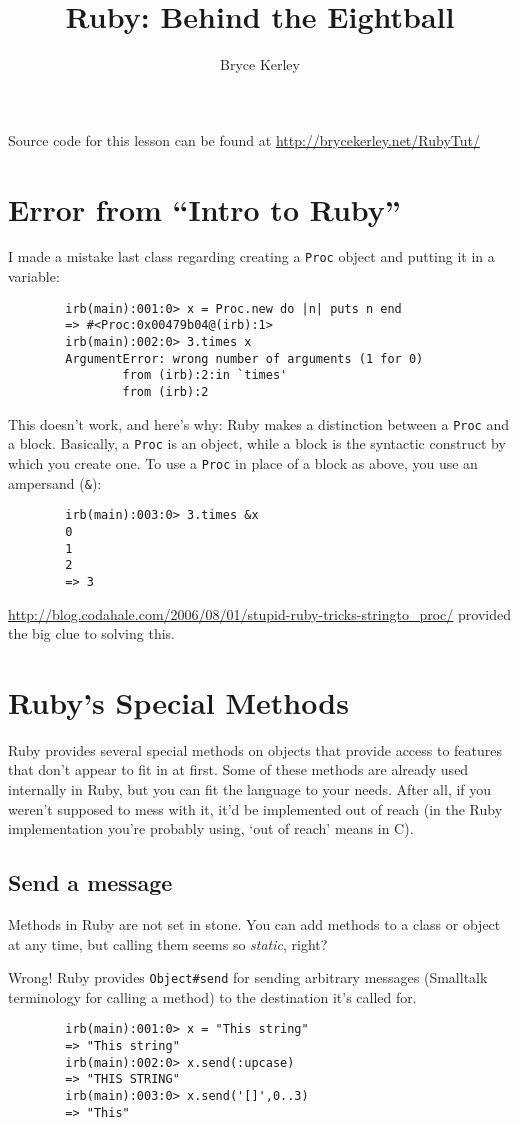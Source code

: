 \documentclass[12pt]{article}
\title{Ruby: Behind the Eightball}
\author{Bryce Kerley}
\begin{document}
	\maketitle
	
	Source code for this lesson can be found at \url{http://brycekerley.net/RubyTut/}
	
	\section{Error from ``Intro to Ruby''}
	I made a mistake last class regarding creating a \verb|Proc| object and putting it in a variable:
	\begin{verbatim}
		irb(main):001:0> x = Proc.new do |n| puts n end
		=> #<Proc:0x00479b04@(irb):1>
		irb(main):002:0> 3.times x  
		ArgumentError: wrong number of arguments (1 for 0)
		        from (irb):2:in `times'
		        from (irb):2
	\end{verbatim}
	This doesn't work, and here's why: Ruby makes a distinction between a \verb|Proc| and a block.  Basically, a \verb|Proc| is an object, while a block is the syntactic construct by which you create one.  To use a \verb|Proc| in place of a block as above, you use an ampersand (\verb|&|):
	\begin{verbatim}
		irb(main):003:0> 3.times &x
		0
		1
		2
		=> 3
	\end{verbatim}
	\url{http://blog.codahale.com/2006/08/01/stupid-ruby-tricks-stringto_proc/} provided the big clue to solving this.
	
	\section{Ruby's Special Methods}
	Ruby provides several special methods on objects that provide access to features that don't appear to fit in at first.  Some of these methods are already used internally in Ruby, but you can fit the language to your needs.  After all, if you weren't supposed to mess with it, it'd be implemented out of reach (in the Ruby implementation you're probably using, `out of reach' means in C).
	
	\subsection{Send a message}
	Methods in Ruby are not set in stone.  You can add methods to a class or object at any time, but calling them seems so \emph{static}, right?
	
	Wrong!  Ruby provides \verb|Object#send| for sending arbitrary messages (Smalltalk terminology for calling a method) to the destination it's called for.
	\begin{verbatim}
		irb(main):001:0> x = "This string"
		=> "This string"
		irb(main):002:0> x.send(:upcase)
		=> "THIS STRING"
		irb(main):003:0> x.send('[]',0..3)
		=> "This"
	\end{verbatim}
	
\end{document}
